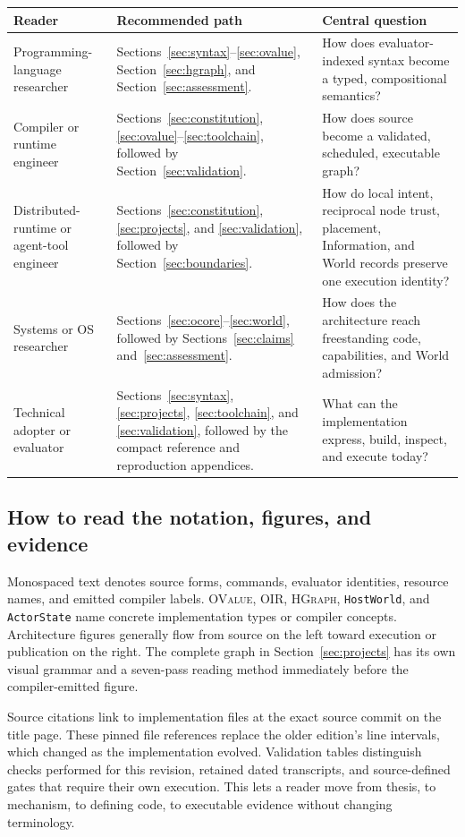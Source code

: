 \documentclass[11pt,oneside]{article}
\newcommand{\ovalue}{{\mdseries\textsc{OValue}}}
\newcommand{\oir}{{\mdseries\textsc{OIR}}}
\newcommand{\hgraph}{{\mdseries\textsc{HGraph}}}
\begin{document}
\begin{longtable}{P{0.22\textwidth} P{0.41\textwidth} P{0.29\textwidth}}
\toprule
\textbf{Reader} & \textbf{Recommended path} & \textbf{Central question} \\
\midrule
\endhead
Programming-language researcher &
Sections~\ref{sec:syntax}--\ref{sec:ovalue}, Section~\ref{sec:hgraph}, and
Section~\ref{sec:assessment}. &
How does evaluator-indexed syntax become a typed, compositional semantics? \\
Compiler or runtime engineer &
Sections~\ref{sec:constitution}, \ref{sec:ovalue}--\ref{sec:toolchain}, followed by
Section~\ref{sec:validation}. &
How does source become a validated, scheduled, executable graph? \\
Distributed-runtime or agent-tool engineer &
Sections~\ref{sec:constitution}, \ref{sec:projects}, and
\ref{sec:validation}, followed by Section~\ref{sec:boundaries}. &
How do local intent, reciprocal node trust, placement, Information, and World
records preserve one execution identity? \\
Systems or OS researcher &
Sections~\ref{sec:ocore}--\ref{sec:world}, followed by
Sections~\ref{sec:claims} and~\ref{sec:assessment}. &
How does the architecture reach freestanding code, capabilities, and World
admission? \\
Technical adopter or evaluator &
Sections~\ref{sec:syntax}, \ref{sec:projects}, \ref{sec:toolchain}, and
\ref{sec:validation}, followed by the compact reference and reproduction
appendices. &
What can the implementation express, build, inspect, and execute today? \\
\bottomrule
\end{longtable}

\subsection*{How to read the notation, figures, and evidence}

Monospaced text denotes source forms, commands, evaluator identities, resource
names, and emitted compiler labels. \ovalue{}, \oir{}, \hgraph{},
\texttt{HostWorld}, and \texttt{ActorState} name concrete implementation
types or compiler concepts. Architecture figures generally flow from source
on the left toward execution or publication on the right. The complete graph
in Section~\ref{sec:projects} has its own visual grammar and a seven-pass
reading method immediately before the compiler-emitted figure.

Source citations link to implementation files at the exact source commit
on the title page. These pinned file references replace the older edition's
line intervals, which changed as the implementation evolved. Validation
tables distinguish checks performed for this revision, retained dated
transcripts, and source-defined gates that require their own execution. This lets a
reader move from thesis, to mechanism, to defining code, to executable
evidence without changing terminology.
\end{document}
